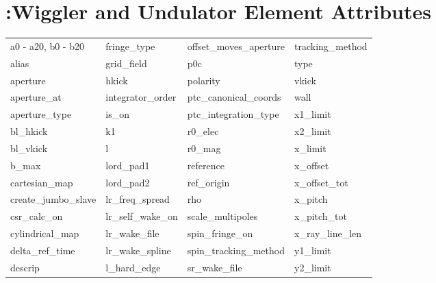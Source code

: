  \section{:Wiggler and Undulator Element Attributes}
 \label{s:list.wiggler}
 
 \begin{tabular}{llll} \toprule
a0 - a20, b0 - b20          & fringe_type                 & offset_moves_aperture       & tracking_method             \\
alias                       & grid_field                  & p0c                         & type                        \\
aperture                    & hkick                       & polarity                    & vkick                       \\
aperture_at                 & integrator_order            & ptc_canonical_coords        & wall                        \\
aperture_type               & is_on                       & ptc_integration_type        & x1_limit                    \\
bl_hkick                    & k1                          & r0_elec                     & x2_limit                    \\
bl_vkick                    & l                           & r0_mag                      & x_limit                     \\
b_max                       & lord_pad1                   & reference                   & x_offset                    \\
cartesian_map               & lord_pad2                   & ref_origin                  & x_offset_tot                \\
create_jumbo_slave          & lr_freq_spread              & rho                         & x_pitch                     \\
csr_calc_on                 & lr_self_wake_on             & scale_multipoles            & x_pitch_tot                 \\
cylindrical_map             & lr_wake_file                & spin_fringe_on              & x_ray_line_len              \\
delta_ref_time              & lr_wake_spline              & spin_tracking_method        & y1_limit                    \\
descrip                     & l_hard_edge                 & sr_wake_file                & y2_limit                    \\

\end{tabular}
